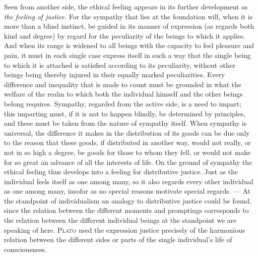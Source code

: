 \documentclass[12pt,a4paper,openany]{book}
\newcommand{\opage}[1]{\marginnote{\footnotesize\textit{[#1]}}}
\begin{document}
Seen from another side, the ethical feeling appears in its further development as \textit{the feeling
of justice.} For the sympathy that lies at the foundation will, when it is more than a blind
instinct, be guided in its manner of expression (as regards both kind and degree) by regard for the
peculiarity of the beings to which it applies. And when its range is widened to all beings with the
capacity to feel pleasure and pain, it must in each single case express itself in such a way that the
single being to which it is attached is satisfied according to its peculiarity, without other beings
being thereby injured in their equally marked peculiarities. Every difference and inequality that is
made to count must be grounded in what the welfare of the realm to which both the individual himself
and the other beings belong requires. Sympathy, regarded from the active side, is a need to impart;
this imparting must, if it is not to happen blindly, be determined by principles, and these must be
taken from the nature of sympathy itself. When sympathy is universal, the difference it makes in the
distribution of its goods can be due only to the reason that these goods, if distributed in another
way, would not really, or not in so high a degree, be goods for those to whom they fell, or would not
make for so great an advance of all the interests of life. On the ground of sympathy the ethical
feeling thus develops into a feeling for distributive justice. Just as the individual feels itself
as one among many, so it also regards every other individual as one among many, insofar as no
special reasons motivate special regards. --- At the standpoint of individualism an analogy to
distributive justice could be found, since the relation between the
\opage{41}different moments and promptings corresponds to the relation between the different individual
beings at the standpoint we are speaking of here. \textsc{Plato} used the expression justice
precisely of the harmonious relation between the different sides or parts of the single
individual's life of consciousness.
\end{document}

